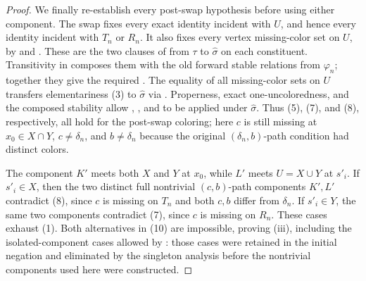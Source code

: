 \begin{proof}
  We finally re-establish every post-swap hypothesis before using either
  component.  The swap fixes every exact identity incident with $U$, and
  hence every identity incident with $T_n$ or $R_n$.  It also fixes every
  vertex missing-color set on $U$, by  and
  .  These are the two clauses of
   from $\tau$ to $\widehat\sigma$ on each
  constituent.  Transitivity in  composes them with the old
  forward stable relations from $\varphi_n$; together they give the required
  .  The equality of all missing-color sets
  on $U$ transfers elementariness (3) to $\widehat\sigma$ via
  .  Properness, exact
  one-uncoloredness, and the composed stability allow
  ,
  , and
   to be applied under
  $\widehat\sigma$.  Thus (5), (7), and (8), respectively, all hold for the
  post-swap coloring; here $c$ is still missing at
  $x_0\in X\cap Y$, $c\ne\delta_n$, and $b\ne\delta_n$ because the original
  $(\delta_n,b)$-path condition had distinct colors.

  The component $K'$ meets both $X$ and $Y$ at $x_0$, while $L'$ meets
  $U=X\cup Y$ at $s'_i$.  If $s'_i\in X$, then the two distinct full
  nontrivial $(c,b)$-path components $K',L'$ contradict (8), since $c$ is
  missing on $T_n$ and both $c,b$ differ from $\delta_n$.  If
  $s'_i\in Y$, the same two components contradict (7), since $c$ is
  missing on $R_n$.  These cases exhaust (1).  Both alternatives in (10)
  are impossible, proving (iii), including the isolated-component cases
  allowed by : those cases were retained in
  the initial negation and eliminated by the singleton analysis before the
  nontrivial components used here were constructed.
  \end{proof}
